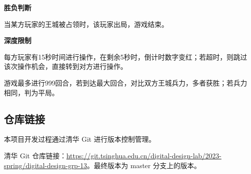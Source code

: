 \noindent \textbf{胜负判断}

当某方玩家的王城被占领时，该玩家出局，游戏结束。

\noindent \textbf{深度限制}

每方玩家有15秒时间进行操作，在剩余5秒时，倒计时数字变红；若超时，则跳过该次操作机会，直接转到对方进行操作。

游戏最多进行999回合，若到达最大回合，对比双方王城兵力，多者获胜；若兵力相同，判为平局。



\subsection{仓库链接}
本项目开发过程通过清华 Git 进行版本控制管理。

清华 Git 仓库链接：\href{https://git.tsinghua.edu.cn/digital-design-lab/2023-spring/digital-design-grp-13}{https://git.tsinghua.edu.cn/digital-design-lab/2023-spring/digital-design-grp-13}。最终版本为 master 分支上的版本。
